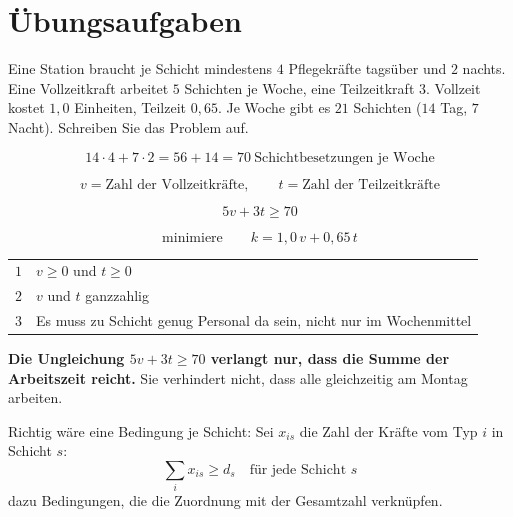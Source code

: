 \section{Übungsaufgaben}

\begin{aufgabe}
Eine Station braucht je Schicht mindestens $4$ Pflegekräfte tagsüber und $2$ nachts. Eine Vollzeitkraft arbeitet $5$ Schichten je Woche, eine Teilzeitkraft $3$. Vollzeit kostet $1{,}0$ Einheiten, Teilzeit $0{,}65$. Je Woche gibt es $21$ Schichten ($14$ Tag, $7$ Nacht). Schreiben Sie das Problem auf.

\loesung
{}
\[ 14 \cdot 4 + 7 \cdot 2 = 56 + 14 = 70 \ \text{Schichtbesetzungen je Woche} \]

\[ v = \text{Zahl der Vollzeitkräfte}, \qquad t = \text{Zahl der Teilzeitkräfte} \]

\[ 5v + 3t \ge 70 \]

\[ \text{minimiere} \qquad k = 1{,}0\,v + 0{,}65\,t \]

\begin{center}
\renewcommand{\arraystretch}{1.5}
\begin{tabular}{@{}P{1.0cm}P{7.4cm}@{}}
\toprule
$1$ & $v \ge 0$ und $t \ge 0$\\
$2$ & $v$ und $t$ ganzzahlig\\
$3$ & Es muss zu  Schicht genug Personal da sein, nicht nur im Wochenmittel\\
\bottomrule
\end{tabular}
\end{center}

\begin{center}
\begin{minipage}{0.9\textwidth}
\textbf{Die Ungleichung $5v+3t \ge 70$ verlangt nur, dass die Summe der Arbeitszeit reicht.} Sie verhindert nicht, dass alle gleichzeitig am Montag arbeiten.
\end{minipage}
\end{center}

Richtig wäre eine Bedingung je Schicht: Sei $x_{is}$ die Zahl der Kräfte vom Typ $i$ in Schicht $s$:
\[ \sum_i x_{is} \ge d_s \quad\text{für jede Schicht } s \]
dazu Bedingungen, die die Zuordnung mit der Gesamtzahl verknüpfen.


\end{aufgabe}
